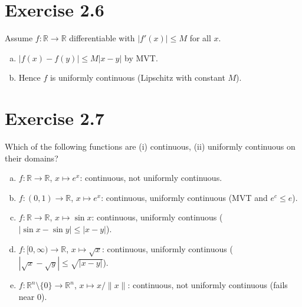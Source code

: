 \documentclass[11pt,a4paper]{article}
\begin{document}
\section*{Exercise 2.6}
Assume $f:\mathbb{R}\to\mathbb{R}$ differentiable with $|f'(x)|\le M$ for all $x$.
\begin{enumerate}[a)]
\item $|f(x)-f(y)|\le M|x-y|$ by MVT.
\item Hence $f$ is uniformly continuous (Lipschitz with constant $M$).
\end{enumerate}

\section*{Exercise 2.7}
Which of the following functions are (i) continuous, (ii) uniformly continuous on their domains?
\begin{enumerate}[a)]
\item $f:\mathbb{R}\to\mathbb{R}$, $x\mapsto e^x$: continuous, not uniformly continuous.
\item $f:(0,1)\to\mathbb{R}$, $x\mapsto e^x$: continuous, uniformly continuous (MVT and $e^c\le e$).
\item $f:\mathbb{R}\to\mathbb{R}$, $x\mapsto\sin x$: continuous, uniformly continuous ($|\sin x-\sin y|\le |x-y|$).
\item $f:[0,\infty)\to\mathbb{R}$, $x\mapsto \sqrt{x}$: continuous, uniformly continuous ($|\sqrt{x}-\sqrt{y}|\le \sqrt{|x-y|}$).
\item[\textit{*}f)] $f:\mathbb{R}^n\setminus\{0\}\to\mathbb{R}^n$, $x\mapsto x/\|x\|$: continuous, not uniformly continuous (fails near $0$).
\end{enumerate}
\end{document}
